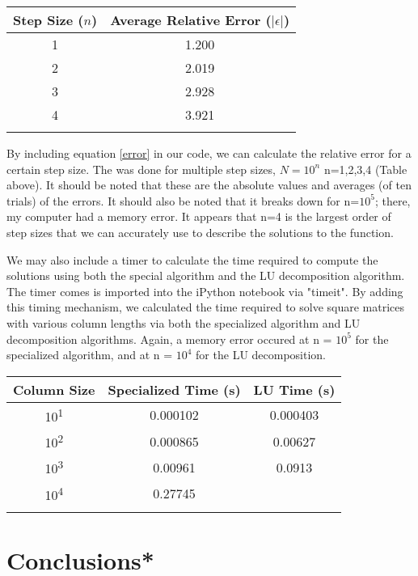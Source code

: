 \documentclass[10pt,showpacs,preprintnumbers,footinbib,amsmath,amssymb,aps,prl,twocolumn,groupedaddress,superscriptaddress,showkeys]{revtex4-1}
\begin{document}
\begin{center}
	\begin{tabular}{cc}
		\hline \hline
			Step Size ($n$) &  Average Relative Error ($|\epsilon|$)\\
			\hline
			1 & 1.200\\
			2 & 2.019\\
			3 & 2.928\\
			4 & 3.921\\
			\hline
			\label{errortable}
	\end{tabular}
\end{center}
	
	By including equation \ref{error} in our code, we can calculate the relative error for a certain step size.  The was done for multiple step sizes, $N=10^{n}$ n=1,2,3,4 (Table above).    It should be noted that these are the absolute values and averages (of ten trials) of the errors.  It should also be noted that it breaks down for n=$10^{5}$; there, my computer had a memory error.  It appears that n=4 is the largest order of step sizes that we can accurately use to describe the solutions to the function.
	
	We may also include a timer to calculate the time required to compute the solutions using both the special algorithm and the LU decomposition algorithm. The timer comes is imported into the iPython notebook via "timeit".  By adding this timing mechanism, we calculated the time required to solve square matrices with various column lengths via both the specialized algorithm and LU decomposition algorithms.  Again, a memory error occured at n = $10^{5}$ for the specialized algorithm, and at n = $10^{4}$ for the LU decomposition.
	

	\begin{center}
		\begin{tabular}{ccc}
			\hline \hline
			Column Size & Specialized Time (s) & LU Time (s)\\
			\hline		
			10\textsuperscript{1} & 0.000102      & 0.000403  \\
			10\textsuperscript{2} & 0.000865      &  0.00627 \\
			10\textsuperscript{3} & 0.00961    &  0.0913  \\
			10\textsuperscript{4} & 0.27745   &  \\
			\hline
			\label{timingtable}
		\end{tabular}
	\end{center}
	
	
\section{Conclusions*}
\end{document}
